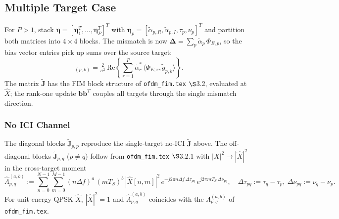 \documentclass[11pt]{article}
\begin{document}
\subsection{Multiple Target Case}

For \(P > 1\), stack \(\bm{\eta} = [\bm{\eta}_1^T, \ldots, \bm{\eta}_P^T]^T\) with \(\bm{\eta}_p = [\tilde{\alpha}_{p,R}, \tilde{\alpha}_{p,I}, \tau_p, \nu_p]^T\) and partition both matrices into \(4 \times 4\) blocks. The mismatch is now \(\bm{\Delta} = \sum_p \tilde{\alpha}_p\, \Phi_{E,p}\), so the bias vector entries pick up sums over the source target:
\begin{equation}
    [\bm{b}]_{(p,k)} = \tfrac{2}{\sigma^2}\, \mathrm{Re}\left\{ \sum_{r=1}^{P} \tilde{\alpha}_r^*\, \langle \Phi_{E,r}, \tilde{g}_{p,k}\rangle \right\}.
\end{equation}
The matrix \(\tilde{\bm{J}}\) has the FIM block structure of \texttt{ofdm\_fim.tex} \(\S\)3.2, evaluated at \(\hat{X}\); the rank-one update \(\bm{b}\bm{b}^T\) couples all targets through the single mismatch direction.

\subsubsection{No ICI Channel}

The diagonal blocks \(\tilde{\bm{J}}_{p,p}\) reproduce the single-target no-ICI \(\tilde{\bm{J}}\) above. The off-diagonal blocks \(\tilde{\bm{J}}_{p,q}\) (\(p \neq q\)) follow from \texttt{ofdm\_fim.tex} \(\S\)3.2.1 with \(|X|^2 \to |\hat{X}|^2\) in the cross-target moment
\begin{equation}
    \hat{\Lambda}_{p,q}^{(a,b)} := \sum_{n=0}^{N-1} \sum_{m=0}^{M-1} (n\Delta f)^a\, (mT_S)^b\, |\hat{X}[n,m]|^2\, e^{-j2\pi n\Delta f\, \Delta\tau_{pq}}\, e^{j2\pi mT_S\, \Delta\nu_{pq}}, \quad \Delta\tau_{pq} := \tau_q - \tau_p,\ \Delta\nu_{pq} := \nu_q - \nu_p.
\end{equation}
For unit-energy QPSK \(\hat{X}\), \(|\hat{X}|^2 = 1\) and \(\hat{\Lambda}_{p,q}^{(a,b)}\) coincides with the \(\Lambda_{p,q}^{(a,b)}\) of \texttt{ofdm\_fim.tex}.
\end{document}
